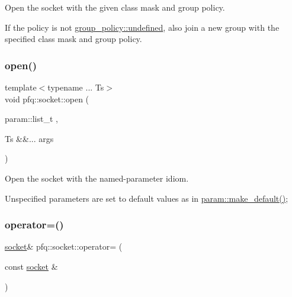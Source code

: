 Open the socket with the given class mask and group policy. 

If the policy is not \hyperlink{namespacepfq_ac41249c8510558905b01fa4d866a38d7a5e543256c480ac577d30f76f9120eb74}{group\+\_\+policy\+::undefined}, also join a new group with the specified class mask and group policy. \mbox{\label{classpfq_1_1socket_a33c3e305c62f5a9f8a0ef74f69097ecf}} 
\subsubsection{\texorpdfstring{open()}{open()}\hspace{0.1cm}{\footnotesize\ttfamily [3/3]}}
{\footnotesize\ttfamily template$<$typename ... Ts$>$ \\
void pfq\+::socket\+::open (\begin{DoxyParamCaption}\item[{param\+::list\+\_\+t}]{,  }\item[{Ts \&\&...}]{args }\end{DoxyParamCaption})\hspace{0.3cm}{\ttfamily [inline]}}



Open the socket with the named-\/parameter idiom. 

Unspecified parameters are set to default values as in \hyperlink{namespacepfq_1_1param_af1fd1aeb980688527db587b35f55abf2}{param\+::make\+\_\+default()}; \mbox{\label{classpfq_1_1socket_a3cfd9674358a2ffd8b37e76d73b8a654}} 
\subsubsection{\texorpdfstring{operator=()}{operator=()}\hspace{0.1cm}{\footnotesize\ttfamily [1/2]}}
{\footnotesize\ttfamily \hyperlink{classpfq_1_1socket}{socket}\& pfq\+::socket\+::operator= (\begin{DoxyParamCaption}\item[{const \hyperlink{classpfq_1_1socket}{socket} \&}]{ }\end{DoxyParamCaption})\hspace{0.3cm}{\ttfamily [delete]}}



